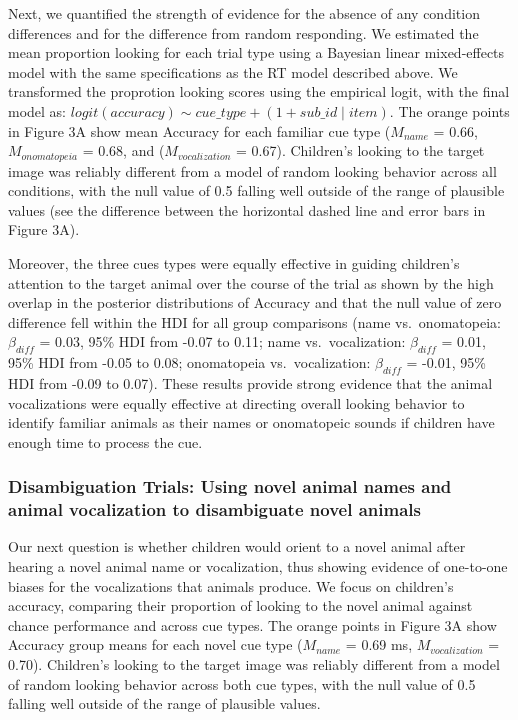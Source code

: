\documentclass[english,floatsintext,man]{apa6}
\theoremstyle{definition}
\theoremstyle{definition}
\theoremstyle{definition}
\theoremstyle{remark}
\begin{document}
Next, we quantified the strength of evidence for the absence of any
condition differences and for the difference from random responding. We
estimated the mean proportion looking for each trial type using a
Bayesian linear mixed-effects model with the same specifications as the
RT model described above. We transformed the proprotion looking scores
using the empirical logit, with the final model as:
\(logit(accuracy) \sim cue\_type + (1 + sub\_id \mid item)\). The orange
points in Figure 3A show mean Accuracy for each familiar cue type
(\(M_{name}\) = 0.66, \(M_{onomatopeia}\) = 0.68, and
(\(M_{vocalization}\) = 0.67). Children's looking to the target image
was reliably different from a model of random looking behavior across
all conditions, with the null value of 0.5 falling well outside of the
range of plausible values (see the difference between the horizontal
dashed line and error bars in Figure 3A).

Moreover, the three cues types were equally effective in guiding
children's attention to the target animal over the course of the trial
as shown by the high overlap in the posterior distributions of Accuracy
and that the null value of zero difference fell within the HDI for all
group comparisons (name vs.~onomatopeia: \(\beta_{diff}\) = 0.03, 95\%
HDI from -0.07 to 0.11; name vs.~vocalization: \(\beta_{diff}\) = 0.01,
95\% HDI from -0.05 to 0.08; onomatopeia vs.~vocalization:
\(\beta_{diff}\) = -0.01, 95\% HDI from -0.09 to 0.07). These results
provide strong evidence that the animal vocalizations were equally
effective at directing overall looking behavior to identify familiar
animals as their names or onomatopeic sounds if children have enough
time to process the cue.

\subsubsection{Disambiguation Trials: Using novel animal names and
animal vocalization to disambiguate novel
animals}\label{disambiguation-trials-using-novel-animal-names-and-animal-vocalization-to-disambiguate-novel-animals}

Our next question is whether children would orient to a novel animal
after hearing a novel animal name or vocalization, thus showing evidence
of one-to-one biases for the vocalizations that animals produce. We
focus on children's accuracy, comparing their proportion of looking to
the novel animal against chance performance and across cue types. The
orange points in Figure 3A show Accuracy group means for each novel cue
type (\(M_{name}\) = 0.69 ms, \(M_{vocalization}\) = 0.70). Children's
looking to the target image was reliably different from a model of
random looking behavior across both cue types, with the null value of
0.5 falling well outside of the range of plausible values.
\end{document}
